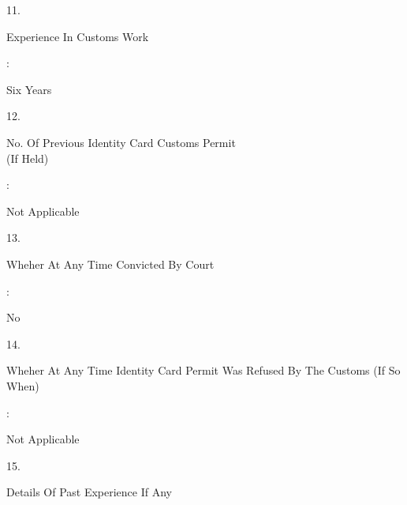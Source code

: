 \documentclass[12pt]{article}
\begin{document}
\begin{minipage}[t]{0.05\linewidth}
11.
\end{minipage}
\begin{minipage}[t]{0.55\linewidth}
Experience In Customs Work
\end{minipage}
\begin{minipage}[t]{0.02\linewidth}
:
\end{minipage}
\begin{minipage}[t]{0.38\linewidth}
Six Years
\end{minipage}
\begin{minipage}[t]{0.05\linewidth}
12.
\end{minipage}
\begin{minipage}[t]{0.55\linewidth}
No. Of Previous Identity Card  Customs Permit
\\
(If Held)
\end{minipage}
\begin{minipage}[t]{0.02\linewidth}
:
\end{minipage}
\begin{minipage}[t]{0.53\linewidth}
Not Applicable
\end{minipage}
\begin{minipage}[t]{0.05\linewidth}
13.
\end{minipage}
\begin{minipage}[t]{0.55\linewidth}
Wheher At Any Time  Convicted By Court
\end{minipage}
\begin{minipage}[t]{0.02\linewidth}
:
\end{minipage}
\begin{minipage}[t]{0.38\linewidth}
No
\end{minipage}
\begin{minipage}[t]{0.05\linewidth}
14.
\end{minipage}
\begin{minipage}[t]{0.55\linewidth}
Wheher At Any Time  Identity  Card  Permit Was  Refused By  The Customs (If So When)
\end{minipage}
\begin{minipage}[t]{0.02\linewidth}
:
\end{minipage}
\begin{minipage}[t]{0.38\linewidth}
Not Applicable
\end{minipage}
\begin{minipage}[t]{0.05\linewidth}
15.
\end{minipage}
\begin{minipage}[t]{0.55\linewidth}
Details Of Past Experience  If Any
\end{minipage}
\end{document}
